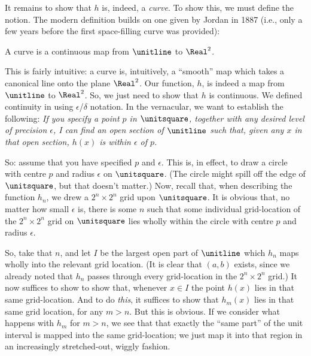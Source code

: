 \documentclass[../../../include/open-logic-section]{subfiles}
\begin{document}
It remains to show that $h$ is, indeed, a \emph{curve}. To show this,
we must define the notion. The modern definition builds on one given
by Jordan in 1887 (i.e., only a few years before the first
space-filling curve was provided): 

\begin{defn}
A curve is a continuous map from $\unitline$ to $\Real^2$. 
\end{defn}

This is fairly intuitive: a curve is, intuitively, a ``smooth'' map
which takes a canonical line onto the plane $\Real^2$. Our function,
$h$, is indeed a map from $\unitline$ to $\Real^2$. So, we just need
to show that $h$ is continuous. We defined continuity in
 using $\epsilon$/$\delta$ notation. In the
vernacular, we want to establish the following: \emph{If you specify a
point $p$ in $\unitsquare$, together with any desired level of
precision $\epsilon$, I can find an open section of $\unitline$ such
that, given any $x$ in that open section, $h(x)$ is within $\epsilon$
of $p$.}

So: assume that you have specified $p$ and $\epsilon$. This is, in
effect, to draw a circle with centre $p$ and radius $\epsilon$ on
$\unitsquare$. (The circle might spill off the edge of $\unitsquare$,
but that doesn't matter.) Now, recall that, when describing the
function $h_n$, we drew a $2^n \times 2^n$ grid upon $\unitsquare$. It
is obvious that, no matter how small $\epsilon$ is, there is some $n$
such that some individual grid-location of the $2^n \times 2^n$ grid
on $\unitsquare$ lies wholly within the circle with centre $p$ and
radius $\epsilon$. 

So, take that $n$, and let $I$ be the largest open part of $\unitline$
which $h_n$ maps wholly into the relevant grid location. (It is clear
that $(a,b)$ exists, since we already noted that $h_n$ passes through
every grid-location in the $2^n\times 2^n$ grid.) It now suffices to
show to show that, whenever $x \in I$ the point $h(x)$ lies in that
same grid-location. And to do \emph{this}, it suffices to show that
$h_m(x)$ lies in that same grid location, for any $m > n$. But this is
obvious. If we consider what happens with $h_m$ for $m > n$, we see
that that exactly the ``same part'' of the unit interval is mapped
into the same grid-location; we just map it into that region in an
increasingly stretched-out, wiggly fashion. 
\end{document}
